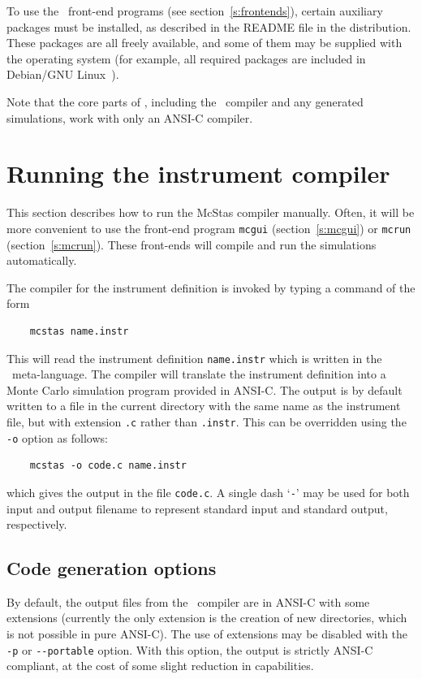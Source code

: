 To use the \MCS\ front-end programs (see section~\ref{s:frontends}),
certain auxiliary packages must be installed, as described in the README
file in the distribution. These packages are all freely available, and
some of
them may be supplied with the operating system (for example,
all required packages are included in Debian/GNU Linux~\cite{debian_webpage}).

Note that the core parts of \MCS, including the \MCS\ compiler and any
generated simulations, work with only
an ANSI-C compiler.


\section{Running the instrument compiler}
\label{s:running}

This section describes how to run the McStas compiler manually. Often,
it will be more convenient to use the front-end program \verb+mcgui+
(section~\ref{s:mcgui}) or \verb+mcrun+ (section~\ref{s:mcrun}). These
front-ends will compile and run the simulations automatically.
 

The compiler for the \MCS{} instrument definition 
is invoked by typing a command of the form
\begin{verbatim}
    mcstas name.instr
\end{verbatim}
This will read the instrument definition \verb+name.instr+ which is
written in the \MCS\ meta-language. The compiler will translate the
instrument definition into a Monte Carlo simulation program provided in
ANSI-C. The output is by default written to a file in the current
directory with the same name as the instrument file, but with extension
\verb+.c+ rather than \verb+.instr+. This can be overridden using the
\verb+-o+ option as follows:
\begin{verbatim}
    mcstas -o code.c name.instr
\end{verbatim}
which gives the output in the file \verb+code.c+.
A single dash `\verb+-+' may be used for both input and output filename
to represent standard input and standard output, respectively.


\subsection{Code generation options}

By default, the output files from the \MCS\ compiler are in ANSI-C with
some extensions (currently the only extension is the creation of new
directories, which is not possible in pure ANSI-C). The use of
extensions may be disabled with the \verb+-p+ or \verb+--portable+
option. With this option, the output is strictly ANSI-C compliant, at
the cost of some slight reduction in capabilities.

